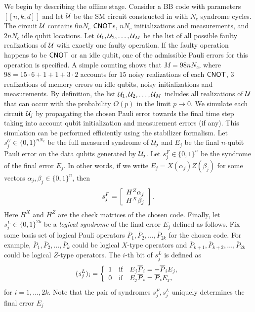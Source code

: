 \documentclass{article}
\begin{document}
We begin by describing the offline stage.
Consider a BB code  with parameters $[[n,k,d]]$ and let
$\calU$ be the SM
circuit 
constructed  in  with $N_c$ syndrome cycles.
The circuit $\calU$ contains $6nN_c$ $\cnotgate$s, $nN_c$ initializations and measurements, and $2n N_c$ idle qubit locations.
Let $\calU_1,\calU_2,\ldots,\calU_M$ be the list of all possible faulty realizations of $\calU$
with  exactly one faulty operation. If the faulty operation happens to be $\cnotgate$ or an idle qubit, 
one of the admissible Pauli errors for this operation is specified. 
A simple counting shows that $M=98nN_c$, where $98=15\cdot 6 + 1 + 1 + 3\cdot 2$
accounts for $15$ noisy realizations of each $\cnotgate$, $3$ realizations of memory errors
on idle qubits, noisy initializations and measurements.  
By definition, the list $\calU_1,\calU_2,\ldots,\calU_M$ includes all realizations of $\calU$
that can occur with the probability $O(p)$ in the limit $p\to 0$.
We simulate each circuit $\calU_j$ by propagating the chosen Pauli error towards the final time step
 taking into account qubit initialization and measurement errors (if any).
This simulation can be performed efficiently using the stabilizer formalism.
Let $s_j^U\in \{0,1\}^{nN_c}$ be the full measured syndrome of $\calU_j$ and $E_j$ be the final 
$n$-qubit Pauli error
on the data qubits generated by $\calU_j$. 
Let $s_j^F\in \{0,1\}^n$ be the syndrome of the final error $E_j$.
In other words, if we write $E_j=X(\alpha_j)Z(\beta_j)$ for some vectors $\alpha_j,\beta_j\in \{0,1\}^n$, then
\[
s_j^F= 
\left[
\ba{c}
H^Z \alpha_j \\ 
H^X \beta_j\\
\ea
\right].
\]
Here $H^X$ and $H^Z$ are the check matrices of the chosen code. 
Finally, let $s_j^L\in \{0,1\}^{2k}$ be a {\em logical syndrome} of the final error $E_j$ defined as follows.
Fix some basis set of logical Pauli operators $\overline{P}_1,\overline{P}_2,\ldots,\overline{P}_{2k}$ for the chosen code.
For example, $\overline{P}_1,\overline{P}_2,\ldots,\overline{P}_k$ could be logical $X$-type operators
and  $\overline{P}_{k+1},\overline{P}_{k+2},\ldots,\overline{P}_{2k}$ could be logical $Z$-type operators.
The $i$-th bit of $s^L_j$ is defined as 
\[
(s_j^L)_i = \left\{
\ba{rcl}
1 &\mbox{if}& E_j \overline{P}_i = -\overline{P}_i  E_j,\\
0  &\mbox{if}& E_j \overline{P}_i = \overline{P}_i  E_j,\\
\ea\right.
\]
for $i=1,\ldots,2k$. Note that the pair of syndromes $s_j^F,s_j^L$ uniquely determines the final error $E_j$
\end{document}
